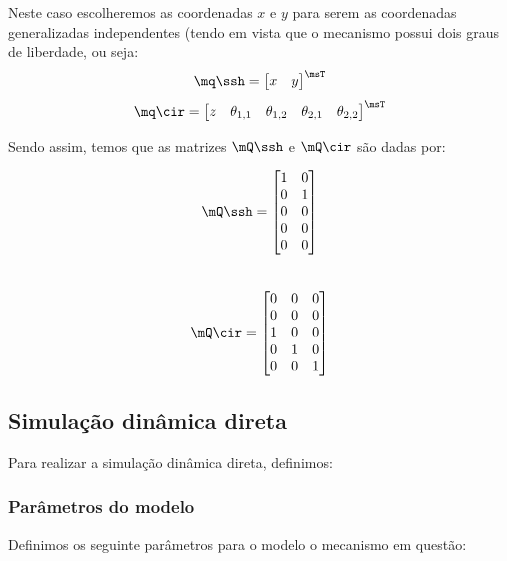 \documentclass[]{politex}
\begin{document}
Neste caso escolheremos as coordenadas $x$ e $y$ para serem as coordenadas generalizadas independentes (tendo em vista que o mecanismo possui dois graus de liberdade, ou seja:
\begin{equation}
\mq\ssh = \begin{bmatrix}
x & y
\end{bmatrix}^\msT
\end{equation}
\begin{equation}
\mq\cir = \begin{bmatrix}
z & \theta_{1,1} & \theta_{1,2} & \theta_{2,1} & \theta_{2,2}
\end{bmatrix}^\msT
\end{equation}

Sendo assim, temos que as matrizes $\mQ\ssh$ e $\mQ\cir$ são dadas por:
\begin{multicols}{2}
\begin{equation}
\mQ\ssh = \begin{bmatrix}
1 & 0 \\
0 & 1 \\
0 & 0 \\
0 & 0 \\
0 & 0 \\
\end{bmatrix}
\end{equation} \\
\begin{equation}
\mQ\cir = \begin{bmatrix}
0 & 0 & 0 \\
0 & 0 & 0 \\
1 & 0 & 0 \\
0 & 1 & 0 \\
0 & 0 & 1 \\
\end{bmatrix}
\end{equation}
\end{multicols}

\subsection{Simulação dinâmica direta}

Para realizar a simulação dinâmica direta, definimos:

\subsubsection{Parâmetros do modelo}

Definimos os seguinte parâmetros para o modelo o mecanismo em questão:
\end{document}
